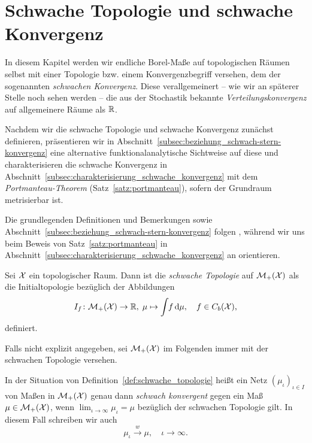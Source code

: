 \documentclass[../thesis/thesis.tex]{subfiles}
\begin{document}
	
	\chapter{Schwache Topologie und schwache Konvergenz}
	\label{chap:schwache_topologie}
	
	In diesem Kapitel werden wir endliche Borel-Maße auf topologischen Räumen selbst
	mit einer Topologie bzw. einem Konvergenzbegriff versehen, dem der sogenannten \emph{schwachen Konvergenz}. Diese
	verallgemeinert -- wie wir an späterer Stelle noch sehen werden -- die aus der Stochastik bekannte \emph{Verteilungskonvergenz} auf allgemeinere Räume als $\mathbb{R}$. 
	
	Nachdem wir die schwache Topologie und schwache Konvergenz zunächst definieren, präsentieren wir in Abschnitt~\ref{subsec:beziehung_schwach-stern-konvergenz}
	eine alternative funktionalanalytische Sichtweise auf diese und charakterisieren die schwache Konvergenz in Abschnitt~\ref{subsec:charakterisierung_schwache_konvergenz} mit dem \emph{Portmanteau-Theorem} (Satz~\ref{satz:portmanteau}), sofern der Grundraum metrisierbar ist.
	
	Die grundlegenden Definitionen und Bemerkungen sowie Abschnitt~\ref{subsec:beziehung_schwach-stern-konvergenz} folgen 
	\cite[Section 1--3]{Varadarajan.1958}, während wir uns beim Beweis von Satz~\ref{satz:portmanteau} in Abschnitt~\ref{subsec:charakterisierung_schwache_konvergenz}
	an \cite[Theorem 4.14.4]{Simon.2015} orientieren.
	
	\begin{Definition}
		\label{def:schwache_topologie}
		Sei $\mathcal{X}$ ein topologischer Raum. Dann ist die \emph{schwache Topologie} auf $\mathcal{M}_{+}(\mathcal{X})$ als die 
		Initialtopologie bezüglich der Abbildungen
		\[ I_f \colon \mathcal{M}_{+}(\mathcal{X}) \to \mathbb{R}, \; \mu \mapsto \int_{} \, f \, \mathrm{d}\mu , \quad f \in C_b(\mathcal{X}) \text{,} \]
		definiert.
	\end{Definition}

	Falls nicht explizit angegeben, sei $\mathcal{M}_{+}(\mathcal{X})$ im Folgenden immer mit der schwachen Topologie versehen.

	\begin{Definition}
		In der Situation von Definition~\ref{def:schwache_topologie} heißt ein Netz $(\mu_\iota)_{\iota \in I}$ von Maßen in $\mathcal{M}_{+}(\mathcal{X})$ genau dann 
		\emph{schwach konvergent} gegen ein Maß $\mu \in \mathcal{M}_{+}(\mathcal{X})$, wenn $\lim_{\iota \to \infty} \mu_\iota = \mu$ bezüglich der schwachen Topologie gilt.
		In diesem Fall schreiben wir auch
		\[ \mu_\iota \xrightarrow{w} \mu, \quad \iota \to \infty \text{.} \]
	\end{Definition}
\end{document}

